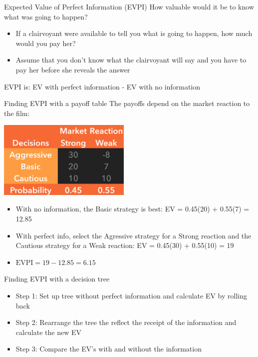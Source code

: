 \documentclass{beamer}\usepackage[]{graphicx}\usepackage[]{color}
\begin{document}
\begin{darkframes}
    \begin{frame}[fragile]{Expected Value of Perfect Information (EVPI)}
        \fontsize{10}{10}\selectfont
        How valuable would it be to know what was going to happen?
          \begin{itemize} [<+->]
            \item If a clairvoyant were available to tell you what is going to happen, how much would you pay her?
            \item Assume that you don't know what the clairvoyant will say and you have to pay her before she reveals the answer
          \end{itemize}  
          \pause
          EVPI is: 
             EV with perfect information - EV with no information
    \end{frame}


    \begin{frame}[fragile]{Finding EVPI with a payoff table}
      \fontsize{10}{10}\selectfont
      The payoffs depend on the market reaction to the film:
        \begin{center}
        \includegraphics[width=2.5in]{BevoPayoffs} 
        \end{center}
        \begin{itemize} [<+->]
          \item With no information, the Basic strategy is best: EV = 0.45(20) + 0.55(7) = 12.85
          \item With perfect info, select the Agressive strategy for a Strong reaction and the Cautious strategy for a Weak reaction: EV = 0.45(30) + 0.55(10) = 19
          \item $\text{EVPI} = 19 - 12.85 = 6.15$
        \end{itemize}        
    \end{frame}     



    \begin{frame}[fragile]{Finding EVPI with a decision tree}
       \fontsize{10}{10}\selectfont   
          \begin{itemize} [<+->]
            \item Step 1: Set up tree without perfect information and calculate EV by rolling back
            \item Step 2: Rearrange the tree the reflect the receipt of the information and calculate the new EV
            \item Step 3: Compare the EV's with and without the information
          \end{itemize}          


\end{frame}
\end{darkframes}
\end{document}
